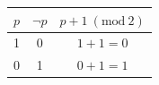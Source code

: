 \begin{table}[h!]
\centering
\begin{tabular}{ccc}
\hline
$p$ & $\neg p$ & $p+1 \ (\mathrm{mod}\ 2)$ \\
\hline
1 & 0 & $1+1=0$ \\
0 & 1 & $0+1=1$ \\
\hline
\end{tabular}
\end{table}
